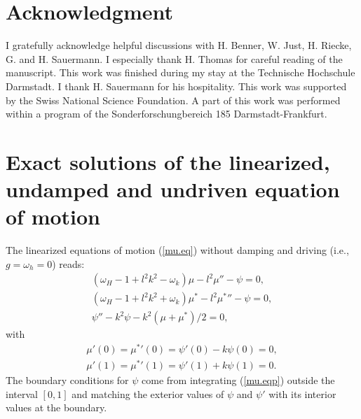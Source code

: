 \section*{Acknowledgment}

I gratefully acknowledge helpful discussions with H. Benner, W. Just,
H. Riecke, G. and H. Sauermann. I especially thank H. Thomas for
careful reading of the manuscript.  This work was finished during my
stay at the Technische Hochschule Darmstadt. I thank H. Sauermann for
his hospitality.  This work was supported by the Swiss National
Science Foundation. A part of this work was performed within a
program of the Sonderforschungbereich 185 Darmstadt-Frankfurt.


\appendix

\section{\protect\label{APA}Exact solutions of the linearized,
undamped and undriven equation of motion}

The linearized equations of motion (\ref{mu.eq}) without damping and 
driving (i.e., $g=\omega_h=0$) reads:
\begin{equation}\begin{array}{r}
   (\omega_H-1+l^2k^2-\omega_k)\mu-l^2\mu''-\psi=0,\\
   (\omega_H-1+l^2k^2+\omega_k)\mu^*-l^2{\mu^*}''-\psi=0,\\
   \psi''-k^2\psi-k^2(\mu+\mu^*)/2=0,\end{array}
  \label{mu.eqN}
\end{equation}
with 
\begin{equation}\begin{array}{c}
  \mu'(0)={\mu^*}'(0)=\psi'(0)-k\psi(0)=0,\\
  \mu'(1)={\mu^*}'(1)=\psi'(1)+k\psi(1)=0.
  \end{array}
  \label{mu.bcN}
\end{equation}
The boundary conditions for $\psi$ come from integrating 
(\ref{mu.eqp}) outside the interval $[0,1]$ and
matching the exterior values of $\psi$ and $\psi'$ with its interior
values at the boundary.

